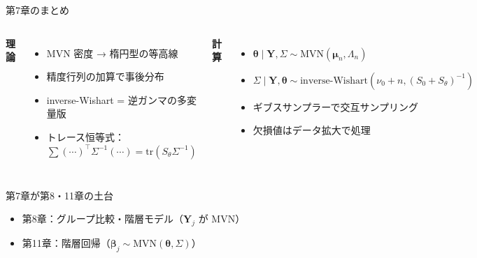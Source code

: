 \documentclass[lualatex,aspectratio=169,12pt]{beamer}
\newcommand{\mvn}{\mathrm{MVN}}
\newcommand{\IW}{\mathrm{inverse\text{-}Wishart}}
\newcommand{\tr}{\mathrm{tr}}
\begin{document}
\begin{frame}{第7章のまとめ}
  \begin{columns}[t]
    \textbf{理論}
    \begin{itemize}
      \item MVN 密度 → 楕円型の等高線
      \item 精度行列の加算で事後分布
      \item inverse-Wishart = 逆ガンマの多変量版
      \item トレース恒等式：$\sum(\cdots)^\top\Sigma^{-1}(\cdots) = \tr(S_\theta\Sigma^{-1})$
    \end{itemize}

    \textbf{計算}
    \begin{itemize}
      \item $\bm{\theta}\mid\bm{Y},\Sigma \sim \mvn(\bm{\mu}_n,\Lambda_n)$
      \item $\Sigma\mid\bm{Y},\bm{\theta} \sim \IW(\nu_0+n,(S_0+S_\theta)^{-1})$
      \item ギブスサンプラーで交互サンプリング
      \item 欠損値はデータ拡大で処理
    \end{itemize}
  \end{columns}

  \vspace{1.5em}
  \begin{block}{第7章が第8・11章の土台}
    \begin{itemize}
      \item 第8章：グループ比較・階層モデル（$\bm{Y}_j$ が MVN）
      \item 第11章：階層回帰（$\bm{\beta}_j \sim \mvn(\bm{\theta},\Sigma)$）
    \end{itemize}
  \end{block}
\end{frame}
\end{document}

